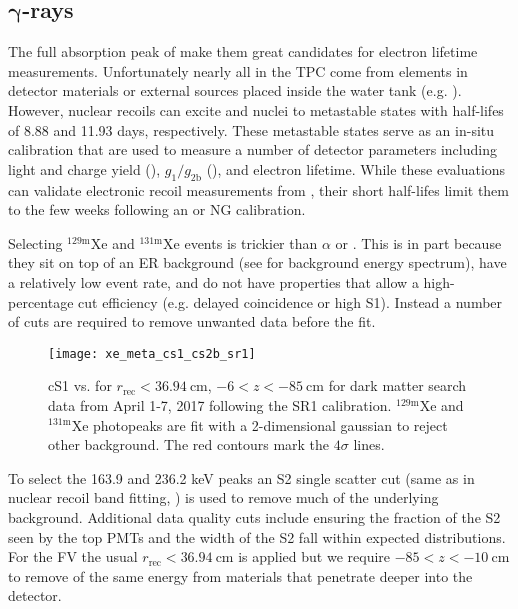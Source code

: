 \subsection{$\mathbf{\gamma}$-rays}
\label{subsec:electron_lifetimes_measurement_gammas}
The full absorption peak of \gammarays make them great candidates for electron lifetime measurements.  Unfortunately nearly all
\gammarays in the TPC come from elements in detector materials or external sources placed inside the water tank
(e.g. ).  However, nuclear recoils can excite  and  nuclei to metastable states with half-lifes
of 8.88 and 11.93 days, respectively.  These metastable states serve as an in-situ calibration that are used to measure a number of
detector parameters including light and charge yield (), $g_1/g_{2\mathrm{b}}$
(), and electron lifetime.  While these evaluations can validate
electronic recoil measurements from , their short half-lifes limit them to the few weeks following an \ambe or NG
calibration.

Selecting $\mathrm{^{129m}Xe}$ and $\mathrm{^{131m}Xe}$ events is trickier than $\alpha$ or .  This is in part because they
sit
on top of an ER background (see  for background energy spectrum), have a
relatively low event rate, and do not have properties that allow a high-percentage cut
efficiency (e.g.  delayed coincidence or high \alphadecay S1).  Instead a number of cuts are required
to remove unwanted data before the fit.

\begin{figure}
\centering
\texttt{[image: xe\_meta\_cs1\_cs2b\_sr1]}
\caption{cS1 vs. \cstwob for $r_{\mathrm{rec}} < 36.94\ \mathrm{cm}$, $-6 < z < -85\ \mathrm{cm}$ for dark matter search data from April
1-7, 2017 following the SR1 \ambe calibration.  $\mathrm{^{129m}Xe}$ and
$\mathrm{^{131m}Xe}$ photopeaks are fit with a 2-dimensional gaussian to reject other background.  The red contours mark
the $4\sigma$ lines.}
\label{fig:electron_lifetimes_measurement_gammas_cs1_cs2}
\end{figure}

To select the 163.9 and 236.2 keV peaks an S2 single scatter cut (same as in nuclear recoil band fitting,
) is used to remove much of the underlying background.  Additional data quality
cuts include ensuring the fraction of the S2 seen by the top PMTs and the width of the S2 fall within expected distributions.  For the FV
the usual $r_{\mathrm{rec}} < 36.94\ \mathrm{cm}$ is applied but we require $-85 < z < -10\ \mathrm{cm}$ to remove \gammarays of the same
energy from materials that penetrate deeper into the detector.


